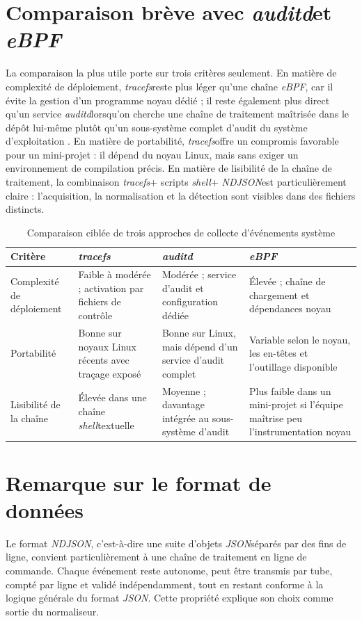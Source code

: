 \documentclass[12pt,a4paper]{report}
\newcommand{\tracefs}{\textit{tracefs}}
\newcommand{\ebpf}{\textit{eBPF}}
\newcommand{\auditd}{\textit{auditd}}
\newcommand{\ndjson}{\textit{NDJSON}}
\newcommand{\jsonfmt}{\textit{JSON}}
\newcommand{\shellterm}{\textit{shell}}
\begin{document}
\section{Comparaison brève avec \auditd et \ebpf}
La comparaison la plus utile porte sur trois critères seulement. En matière de complexité de déploiement, \tracefs reste plus léger qu’une chaîne \ebpf, car il évite la gestion d’un programme noyau dédié ; il reste également plus direct qu’un service \auditd lorsqu’on cherche une chaîne de traitement maîtrisée dans le dépôt lui-même plutôt qu’un sous-système complet d’audit du système d’exploitation \autocite{auditd-man}. En matière de portabilité, \tracefs offre un compromis favorable pour un mini-projet : il dépend du noyau Linux, mais sans exiger un environnement de compilation précis. En matière de lisibilité de la chaîne de traitement, la combinaison \tracefs + scripts \shellterm + \ndjson est particulièrement claire : l’acquisition, la normalisation et la détection sont visibles dans des fichiers distincts.

\begin{table}[h]
\centering
\begin{tabular}{>{\raggedright\arraybackslash}p{3.2cm} >{\raggedright\arraybackslash}p{3.8cm} >{\raggedright\arraybackslash}p{3.2cm} >{\raggedright\arraybackslash}p{3.2cm}}
\toprule
Critère & \tracefs & \auditd & \ebpf \\
\midrule
Complexité de déploiement & Faible à modérée ; activation par fichiers de contrôle & Modérée ; service d’audit et configuration dédiée & Élevée ; chaîne de chargement et dépendances noyau \\
Portabilité & Bonne sur noyaux Linux récents avec traçage exposé & Bonne sur Linux, mais dépend d’un service d’audit complet & Variable selon le noyau, les en-têtes et l’outillage disponible \\
Lisibilité de la chaîne & Élevée dans une chaîne \shellterm textuelle & Moyenne ; davantage intégrée au sous-système d’audit & Plus faible dans un mini-projet si l’équipe maîtrise peu l’instrumentation noyau \\
\bottomrule
\end{tabular}
\caption{Comparaison ciblée de trois approches de collecte d’événements système}
\end{table}

\section{Remarque sur le format de données}
Le format \ndjson, c’est-à-dire une suite d’objets \jsonfmt séparés par des fins de ligne, convient particulièrement à une chaîne de traitement en ligne de commande. Chaque événement reste autonome, peut être transmis par tube, compté par ligne et validé indépendamment, tout en restant conforme à la logique générale du format \jsonfmt \autocite{ndjson-spec,rfc8259}. Cette propriété explique son choix comme sortie du normaliseur.
\end{document}
